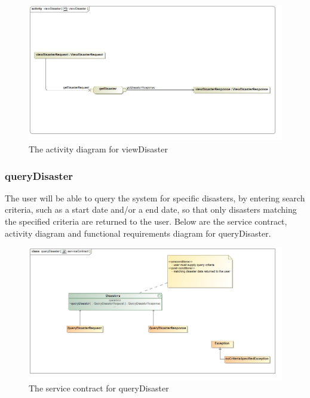\begin{figure}[H]
	\centering
	\includegraphics[width=1.0\textwidth]{../images/funcReq/viewDisasterActivityDiagram.jpg}
	\caption{The activity diagram for viewDisaster \label{overflow}}
\end{figure}

\subsubsection{queryDisaster}

The user will be able to query the system for specific disasters, by entering search criteria, such as a start date and/or a end date, so that only disasters matching the specified criteria are returned to the user. Below are the service contract, activity diagram and functional requirements diagram for queryDisaster.

 \begin{figure}[H]
	\centering
	\includegraphics[width=1.0\textwidth]{../images/funcReq/queryDisasterServiceContract.jpg}
	\caption{The service contract for queryDisaster \label{overflow}}
\end{figure}

